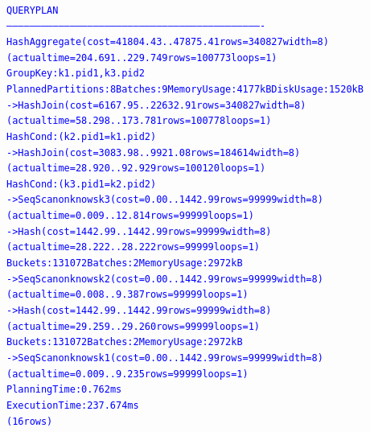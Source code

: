 \documentclass{article}
\begin{document}
    \begin{center}
      {\tiny
      \begin{alltt}
      \textcolor{blue}{
        QUERY PLAN                                                              
        -------------------------------------------------------------------------------------------------------------------------------------
         HashAggregate  (cost=41804.43..47875.41 rows=340827 width=8) (actual time=204.691..229.749 rows=100773 loops=1)
           Group Key: k1.pid1, k3.pid2
           Planned Partitions: 8  Batches: 9  Memory Usage: 4177kB  Disk Usage: 1520kB
           ->  Hash Join  (cost=6167.95..22632.91 rows=340827 width=8) (actual time=58.298..173.781 rows=100778 loops=1)
                 Hash Cond: (k2.pid1 = k1.pid2)
                 ->  Hash Join  (cost=3083.98..9921.08 rows=184614 width=8) (actual time=28.920..92.929 rows=100120 loops=1)
                       Hash Cond: (k3.pid1 = k2.pid2)
                       ->  Seq Scan on knows k3  (cost=0.00..1442.99 rows=99999 width=8) (actual time=0.009..12.814 rows=99999 loops=1)
                       ->  Hash  (cost=1442.99..1442.99 rows=99999 width=8) (actual time=28.222..28.222 rows=99999 loops=1)
                             Buckets: 131072  Batches: 2  Memory Usage: 2972kB
                             ->  Seq Scan on knows k2  (cost=0.00..1442.99 rows=99999 width=8) (actual time=0.008..9.387 rows=99999 loops=1)
                 ->  Hash  (cost=1442.99..1442.99 rows=99999 width=8) (actual time=29.259..29.260 rows=99999 loops=1)
                       Buckets: 131072  Batches: 2  Memory Usage: 2972kB
                       ->  Seq Scan on knows k1  (cost=0.00..1442.99 rows=99999 width=8) (actual time=0.009..9.235 rows=99999 loops=1)
         Planning Time: 0.762 ms
         Execution Time: 237.674 ms
        (16 rows)
       }
      \end{alltt}
      }
    \end{center}
\end{document}
